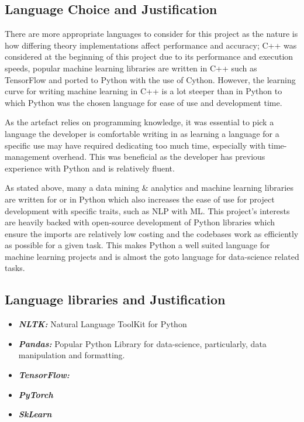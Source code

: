 \subsection{Language Choice and Justification}

There are more appropriate languages to consider for this project as the nature is how differing theory implementations affect performance and accuracy; C++ was considered at the beginning of this project due to its performance and execution speeds, popular machine learning libraries are written in C++ such as TensorFlow and ported to Python with the use of Cython. However, the learning curve for writing machine learning in C++ is a lot steeper than in Python to which Python was the chosen language for ease of use and development time.

As the artefact relies on programming knowledge, it was essential to pick a language the developer is comfortable writing in as learning a language for a specific use may have required dedicating too much time, especially with time-management overhead. This was beneficial as the developer has previous experience with Python and is relatively fluent.

As stated above, many a data mining \& analytics and machine learning libraries are written for or in Python which also increases the ease of use for project development with specific traits, such as NLP with ML. This project's interests are heavily backed with open-source development of Python libraries which ensure the imports are relatively low costing and the codebases work as efficiently as possible for a given task. This makes Python a well suited language for machine learning projects and is almost the goto language for data-science related tasks. \newpage

\subsection{Language libraries and Justification}

\begin{itemize}
    \item \textbf{\textit{NLTK:}} Natural Language ToolKit for Python
    \item \textbf{\textit{Pandas:}} Popular Python Library for data-science, particularly, data manipulation and formatting.
    \item \textbf{\textit{TensorFlow:}}
    \item \textbf{\textit{PyTorch}}
    \item \textbf{\textit{SkLearn}}
\end{itemize}

